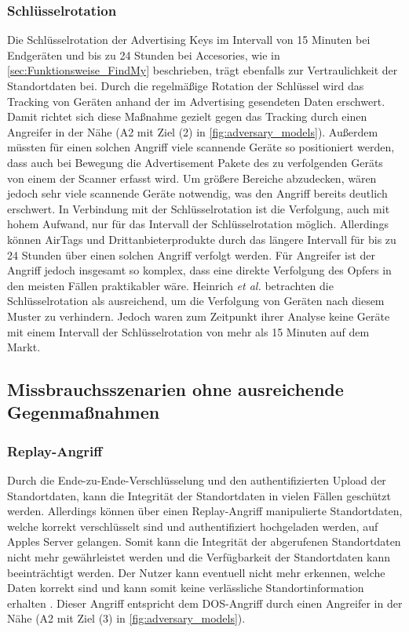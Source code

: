 \subsubsection{Schlüsselrotation}
Die Schlüsselrotation der Advertising Keys im Intervall von 15 Minuten bei Endgeräten und bis zu 24 Stunden bei Accesories, wie in \autoref{sec:Funktionsweise_FindMy} beschrieben, trägt ebenfalls zur Vertraulichkeit der Standortdaten bei.
Durch die regelmäßige Rotation der Schlüssel wird das Tracking von Geräten anhand der im Advertising gesendeten Daten erschwert.
Damit richtet sich diese Maßnahme gezielt gegen das Tracking durch einen Angreifer in der Nähe (A2 mit Ziel (2) in \autoref{fig:adversary_models}).
Außerdem müssten für einen solchen Angriff viele scannende Geräte so positioniert werden, dass auch bei Bewegung die Advertisement Pakete des zu verfolgenden Geräts von einem der Scanner erfasst wird.
Um größere Bereiche abzudecken, wären jedoch sehr viele scannende Geräte notwendig, was den Angriff bereits deutlich erschwert.
In Verbindung mit der Schlüsselrotation ist die Verfolgung, auch mit hohem Aufwand, nur für das Intervall der Schlüsselrotation möglich.
Allerdings können AirTags und Drittanbieterprodukte durch das längere Intervall für bis zu 24 Stunden über einen solchen Angriff verfolgt werden.
Für Angreifer ist der Angriff jedoch insgesamt so komplex, dass eine direkte Verfolgung des Opfers in den meisten Fällen praktikabler wäre.
Heinrich \textit{et al.} \cite{Heinrich_FindMy} betrachten die Schlüsselrotation als ausreichend, um die Verfolgung von Geräten nach diesem Muster zu verhindern.
Jedoch waren zum Zeitpunkt ihrer Analyse keine Geräte mit einem Intervall der Schlüsselrotation von mehr als 15 Minuten auf dem Markt.

\subsection{Missbrauchsszenarien ohne ausreichende Gegenmaßnahmen}
\label{sec:szenarien}

\subsubsection{Replay-Angriff}
Durch die Ende-zu-Ende-Verschlüsselung und den authentifizierten Upload der Standortdaten, kann die Integrität der Standortdaten in vielen Fällen geschützt werden.
Allerdings können über einen Replay-Angriff manipulierte Standortdaten, welche korrekt verschlüsselt sind und authentifiziert hochgeladen werden, auf Apples Server gelangen.
Somit kann die Integrität der abgerufenen Standortdaten nicht mehr gewährleistet werden und die Verfügbarkeit der Standortdaten kann beeinträchtigt werden.
Der Nutzer kann eventuell nicht mehr erkennen, welche Daten korrekt sind und kann somit keine verlässliche Standortinformation erhalten \cite{Heinrich_FindMy}.
Dieser Angriff entspricht dem \ac{DOS}-Angriff durch einen Angreifer in der Nähe (A2 mit Ziel (3) in \autoref{fig:adversary_models}).

